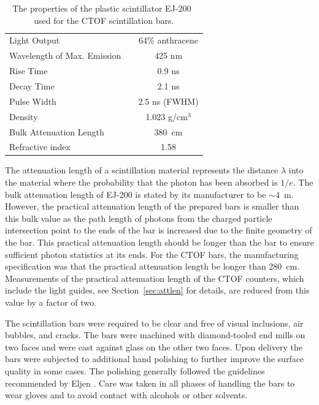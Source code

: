 \documentclass[3p,times,twocolumn]{elsarticle}
\begin{document}
\begin{table}[htbp]
\begin{center}
\begin{tabular}{lc} \hline
Light Output                  & 64\% anthracene \\
Wavelength of Max. Emission~~ & 425 nm \\
Rise Time                     & 0.9 ns \\
Decay Time                    & 2.1 ns \\
Pulse Width                   & 2.5 ns (FWHM) \\
Density                       & 1.023 g/cm$^3$ \\
Bulk Attenuation Length       & 380~cm \\
Refractive index              & 1.58 \\ \hline 
\end{tabular}
\end{center}
\caption{The properties of the plastic scintillator EJ-200~\cite{eljen-ref} used for the CTOF scintillation
bars.}
\label{ej200-specs}
\end{table}

The attenuation length of a scintillation material represents the distance $\lambda$ into the material
where the probability that the photon has been absorbed is $1/e$.  The bulk attenuation length of EJ-200
is stated by its manufacturer to be $\sim$4~m. However, the practical attenuation length of the prepared
bars is smaller than this bulk value as the path length of photons from the charged particle intersection
point to the ends of the bar is increased due to the finite geometry of the bar. This practical attenuation
length should be longer than the bar to ensure sufficient photon statistics at its ends. For the CTOF bars,
the manufacturing specification was that the practical attenuation length be longer than 280~cm.
Measurements of the practical attenuation length of the CTOF counters, which include the light guides,
see Section~\ref{sec:attlen} for details, are reduced from this value by a factor of two.

The scintillation bars were required to be clear and free of visual inclusions, air bubbles, and cracks. The
bars were machined with diamond-tooled end mills on two faces and were cast against glass on the other
two faces. Upon delivery the bars were subjected to additional hand polishing to further improve the
surface quality in some cases. The polishing generally followed the guidelines recommended by Eljen
\cite{eljen-guide}. Care was taken in all phases of handling the bars to wear gloves and to avoid contact
with alcohols or other solvents.
\end{document}
